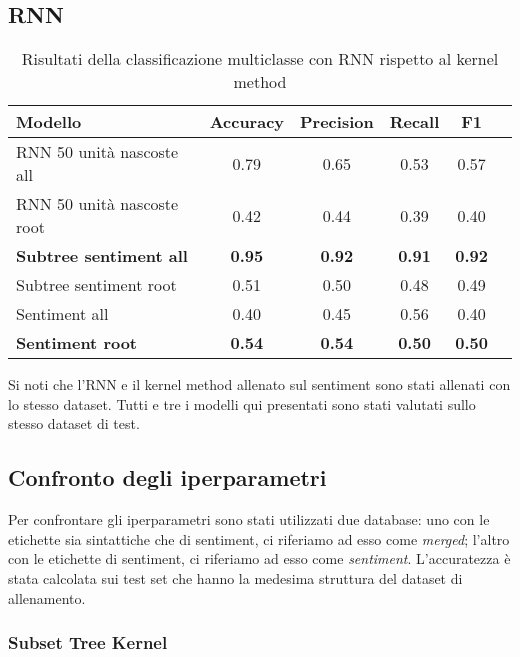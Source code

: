 \subsection{RNN}

\begin{table}[H]
    \centering
    \begin{tabular}{|l|c|c|c|c|c|}
    \hline
    Modello & Accuracy & Precision & Recall & F1 \\
    \hline
    RNN 50 unità nascoste all & 0.79 & 0.65 & 0.53 & 0.57 \\
    RNN 50 unità nascoste root & 0.42 & 0.44 & 0.39 & 0.40 \\
    \hline

    \textbf{Subtree sentiment all} & \textbf{0.95} & \textbf{0.92} &
        \textbf{0.91} & \textbf{0.92} \\
    Subtree sentiment root & 0.51 & 0.50 & 0.48 & 0.49 \\
    \hline

    Sentiment all & 0.40 & 0.45 & 0.56 & 0.40 \\
    \textbf{Sentiment root} & \textbf{0.54} & \textbf{0.54} & \textbf{0.50}
        & \textbf{0.50} \\
    \hline
    \end{tabular}
    \caption{Risultati della classificazione multiclasse con RNN rispetto al
    kernel method}
\end{table}
 
Si noti che l'RNN e il kernel method allenato sul sentiment sono stati allenati
con lo stesso dataset. Tutti e tre i modelli qui presentati sono
stati valutati sullo stesso dataset di test.

\subsection{Confronto degli iperparametri}

Per confrontare gli iperparametri sono stati utilizzati due database: uno con le
etichette sia sintattiche che di sentiment, ci riferiamo ad esso come
\textit{merged}; l'altro con le etichette di sentiment, ci riferiamo ad esso
come \textit{sentiment}. L'accuratezza è stata calcolata sui test set che hanno
la medesima struttura del dataset di allenamento.\\

\subsubsection{Subset Tree Kernel}

